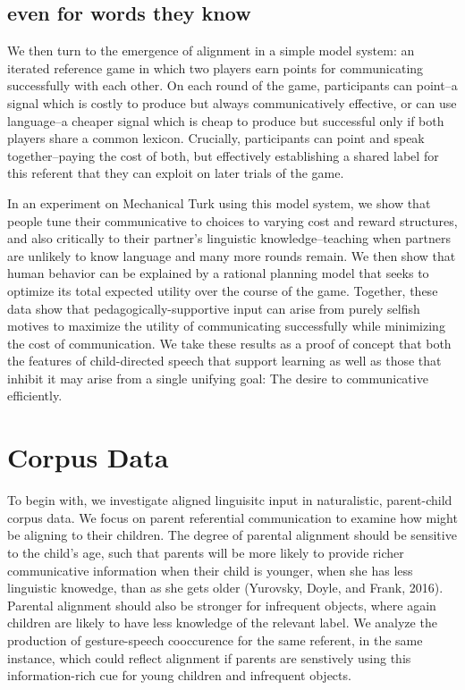 \documentclass[10pt, letterpaper]{article}
\begin{document}
\subsection{even for words they know}\label{even-for-words-they-know}

We then turn to the emergence of alignment in a simple model system: an
iterated reference game in which two players earn points for
communicating successfully with each other. On each round of the game,
participants can point--a signal which is costly to produce but always
communicatively effective, or can use language--a cheaper signal which
is cheap to produce but successful only if both players share a common
lexicon. Crucially, participants can point and speak together--paying
the cost of both, but effectively establishing a shared label for this
referent that they can exploit on later trials of the game.

In an experiment on Mechanical Turk using this model system, we show
that people tune their communicative to choices to varying cost and
reward structures, and also critically to their partner's linguistic
knowledge--teaching when partners are unlikely to know language and many
more rounds remain. We then show that human behavior can be explained by
a rational planning model that seeks to optimize its total expected
utility over the course of the game. Together, these data show that
pedagogically-supportive input can arise from purely selfish motives to
maximize the utility of communicating successfully while minimizing the
cost of communication. We take these results as a proof of concept that
both the features of child-directed speech that support learning as well
as those that inhibit it may arise from a single unifying goal: The
desire to communicative efficiently.

\section{Corpus Data}\label{corpus-data}

To begin with, we investigate aligned linguisitc input in naturalistic,
parent-child corpus data. We focus on parent referential communication
to examine how might be aligning to their children. The degree of
parental alignment should be sensitive to the child's age, such that
parents will be more likely to provide richer communicative information
when their child is younger, when she has less linguistic knowedge, than
as she gets older (Yurovsky, Doyle, and Frank, 2016). Parental alignment
should also be stronger for infrequent objects, where again children are
likely to have less knowledge of the relevant label. We analyze the
production of gesture-speech cooccurence for the same referent, in the
same instance, which could reflect alignment if parents are senstively
using this information-rich cue for young children and infrequent
objects.
\end{document}
